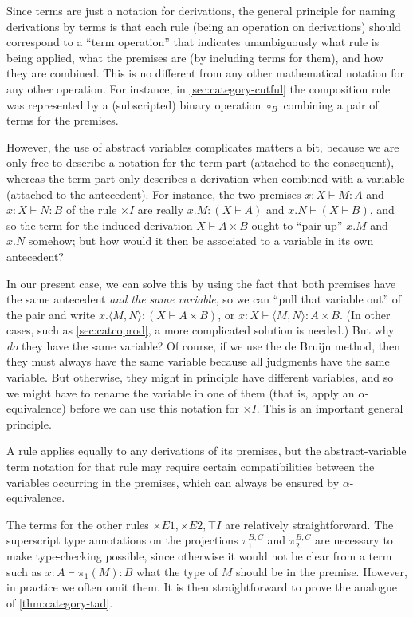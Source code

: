 \documentclass{book}
\let\types\vdash
\def\unit{\top}%
\def\timesE{\ensuremath{\mathord{\times}E}}
\def\timesI{\ensuremath{\mathord{\times}I}}
\def\pair#1#2{\langle #1,#2\rangle}
\def\pr#1#2#3{\pi_{#1}^{#2,#3}}
\begin{document}
Since terms are just a notation for derivations, the general principle for naming derivations by terms is that each rule (being an operation on derivations) should correspond to a ``term operation'' that indicates unambiguously what rule is being applied, what the premises are (by including terms for them), and how they are combined.
This is no different from any other mathematical notation for any other operation.
For instance, in \cref{sec:category-cutful} the composition rule was represented by a (subscripted) binary operation $\circ_B$ combining a pair of terms for the premises.

However, the use of abstract variables complicates matters a bit, because we are only free to describe a notation for the term part (attached to the consequent), whereas the term part only describes a derivation when combined with a variable (attached to the antecedent).
For instance, the two premises $x:X\types M:A$ and $x:X\types N:B$ of the rule $\timesI$ are really $x.M:(X\types A)$ and $x.N\types (X\types B)$, and so the term for the induced derivation $X\types A\times B$ ought to ``pair up'' $x.M$ and $x.N$ somehow; but how would it then be associated to a variable in its own antecedent?

In our present case, we can solve this by using the fact that both premises have the same antecedent \emph{and the same variable}, so we can ``pull that variable out'' of the pair and write $x.\pair M N : (X\types A\times B)$, or $x:X\types \pair M N :A\times B$.
(In other cases, such as \cref{sec:catcoprod}, a more complicated solution is needed.)
But why \emph{do} they have the same variable?
Of course, if we use the de Bruijn method, then they must always have the same variable because all judgments have the same variable.
But otherwise, they might in principle have different variables, and so we might have to rename the variable in one of them (that is, apply an $\alpha$-equivalence) before we can use this notation for $\timesI$.
This is an important general principle.

\begin{princ}\label{princ:term-der-alpha}
  A rule applies equally to any derivations of its premises, but the abstract-variable term notation for that rule may require certain compatibilities between the variables occurring in the premises, which can always be ensured by $\alpha$-equivalence.
\end{princ}

The terms for the other rules $\timesE1,\timesE2,\unit I$ are relatively straightforward.
The superscript type annotations on the projections $\pr1BC$ and $\pr2BC$ are necessary to make type-checking possible, since otherwise it would not be clear from a term such as $x:A \types \pi_1(M):B$ what the type of $M$ should be in the premise.
However, in practice we often omit them.
It is then straightforward to prove the analogue of \cref{thm:category-tad}.
\end{document}

